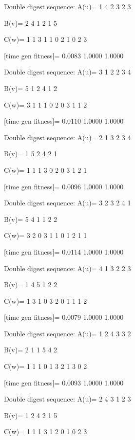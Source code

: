 Double digest sequence:
A(u)=
     1     4     2     3     2     3

B(v)=
     2     4     1     2     1     5

C(w)=
     1     1     3     1     1     0     2     1     0     2     3

[time gen fitness]=
    0.0083    1.0000    1.0000

Double digest sequence:
A(u)=
     3     1     2     2     3     4

B(v)=
     5     1     2     4     1     2

C(w)=
     3     1     1     1     0     2     0     3     1     1     2

[time gen fitness]=
    0.0110    1.0000    1.0000

Double digest sequence:
A(u)=
     2     1     3     2     3     4

B(v)=
     1     5     2     4     2     1

C(w)=
     1     1     1     3     0     2     0     3     1     2     1

[time gen fitness]=
    0.0096    1.0000    1.0000

Double digest sequence:
A(u)=
     3     2     3     2     4     1

B(v)=
     5     4     1     1     2     2

C(w)=
     3     2     0     3     1     1     0     1     2     1     1

[time gen fitness]=
    0.0114    1.0000    1.0000

Double digest sequence:
A(u)=
     4     1     3     2     2     3

B(v)=
     1     4     5     1     2     2

C(w)=
     1     3     1     0     3     2     0     1     1     1     2

[time gen fitness]=
    0.0079    1.0000    1.0000

Double digest sequence:
A(u)=
     1     2     4     3     3     2

B(v)=
     2     1     1     5     4     2

C(w)=
     1     1     1     0     1     3     2     1     3     0     2

[time gen fitness]=
    0.0093    1.0000    1.0000

Double digest sequence:
A(u)=
     2     4     3     1     2     3

B(v)=
     1     2     4     2     1     5

C(w)=
     1     1     1     3     1     2     0     1     0     2     3

